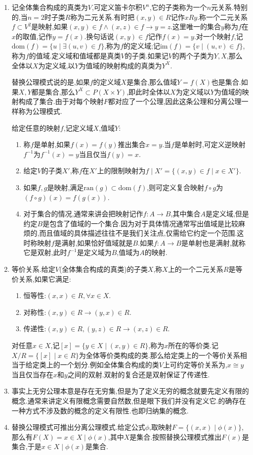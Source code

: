 \begin{enumerate}
	\item 记全体集合构成的真类为$V$,可定义笛卡尔积$V^n$,它的子类称为一个$n$元关系.特别的,当$n=2$时子类$R$称为二元关系.有时把$(x,y)\in R$记作$xRy$.称一个二元关系$f\subset V^2$是映射,如果$(x,y)\in f\wedge (x,z)\in f\rightarrow y=z$.这里唯一的集合$y$称为$f$在$x$的取值,记作$y=f(x)$.换句话说$(x,y)\in f$记作$f(x)=y$.对一个映射$f$,记$\mathrm{dom}(f)=\{u\mid \exists (u,v)\in f\}$,称为$f$的定义域;记$\mathrm{im}(f)=\{v\mid (u,v)\in f\}$,称为$f$的值域.定义域和值域都是真类$V$的子类.如果记$V$的两个子类为$Y,X$,那么全体以$X$为定义域,以$Y$为值域的映射构成的真类为$Y^X$.
	
	替换公理模式说的是,如果$f$的定义域$X$是集合,那么值域$Y=f(X)$也是集合.如果$X,Y$都是集合,那么$Y^X\subset P(X\times Y)$,即此时全体以$X$为定义域以$Y$为值域的映射构成了集合.由于对每个映射$F$都对应了一个公理,因此这条公理和分离公理一样称为公理模式.
	
	给定任意的映射$f$,记定义域$X$,值域$Y$:
	\begin{enumerate}
		\item 称$f$是单射,如果$f(x)=f(y)$推出集合$x=y$.当$f$是单射时,可定义逆映射$f^{-1}$为$f^{-1}(x)=y$当且仅当$f(y)=x$.
		\item 给定$V$的子类$X'$,称$f$在$X'$上的限制映射为$f\mid X'=\{(x,y)\in f\mid x\in X'\}$.
		\item 如果$f,g$是映射,满足$\mathrm{ran}(g)\subset\mathrm{dom}(f)$,则可定义复合映射$f\circ g$为$(f\circ g)(x)=f(g(x))$.
		\item 对于集合的情况,通常来讲会把映射记作$f:A\to B$,其中集合$A$是定义域,但是约定$B$是包含了值域的一个集合.因为对于具体情况通常写出值域是比较麻烦的,而且值域的具体描述往往不是我们关注点,仅需给它约定一个范围.这时称映射$f$是满射,如果恰好值域就是$B$.如果$f:A\to B$是单射也是满射,就称它是双射,此时$f^{-1}$是定义域为$B$,值域为$A$的映射.
	\end{enumerate}
    \item 等价关系.给定$V$(全体集合构成的真类)的子类$X$,称$X$上的一个二元关系$R$是等价关系,如果它满足:
    \begin{enumerate}
    	\item 恒等性:$(x,x)\in R,\forall x\in X$.
    	\item 对称性:$(x,y)\in R\rightarrow (y,x)\in R$.
    	\item 传递性:$(x,y)\in R,(y,z)\in R\rightarrow (x,z)\in R$.
    \end{enumerate}

    对任意$x\in X$,记$[x]=\{y\in X\mid (x,y)\in R\}$,称为$x$所在的等价类.记$X/R=\{[x]\mid x\in R\}$为全体等价类构成的类.那么给定类上的一个等价关系相当于给定类上的一个划分.例如全体集合构成的类$V$上可约定等价关系为,$x\cong y$当且仅当存在$x$和$y$之间的双射.双射的复合还是双射保证了传递性.
    \item 事实上无穷公理本意是存在无穷集,但是为了定义无穷的概念就要先定义有限的概念.通常来讲定义有限概念需要自然数,但是眼下我们并没有定义它.的确存在一种方式不涉及数的概念的定义有限性.也即归纳集的概念.
    \item 替换公理模式可推出分离公理模式.给定公式$\phi$,取映射$F=\{(x,x)\mid\phi(x)\}$,那么有$F(X)={x\in X\mid \phi(x)}$,其中$X$是集合.按照替换公理模式推出$F(x)$是集合,于是${x\in X\mid\phi(x)}$是集合.
\end{enumerate}


